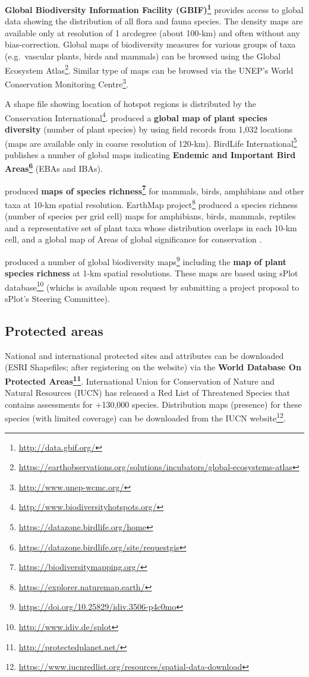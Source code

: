 \documentclass[
  graybox,natbib,nospthms]{svmono}
\renewcommand{\href}[2]{#2 (\url{#1})}
\renewcommand{\href}[2]{#2\footnote{\url{#1}}}
\begin{document}
\textbf{\href{http://data.gbif.org/}{Global Biodiversity Information Facility (GBIF)}} provides access to global data showing the distribution of
all flora and fauna species. The density maps are available only at resolution of
1 arcdegree (about 100-km) and often without any bias-correction. Global maps of biodiversity measures for various groups
of taxa (e.g.~vascular plants, birds and mammals) can be browsed using the \href{https://earthobservations.org/solutions/incubators/global-ecosystems-atlas}{Global Ecosystem Atlas}.
Similar type of maps can be browsed via the \href{http://www.unep-wcmc.org/}{UNEP's World Conservation Monitoring Centre}.

A shape file showing location of hotspot regions is distributed by the \href{http://www.biodiversityhotspots.org/}{Conservation International}.
\citet{Kreft2007} produced a \textbf{global map of plant species diversity} (number of plant species) by using
field records from 1,032 locations (maps are available only in coarse resolution of 120-km).
\href{https://datazone.birdlife.org/home}{BirdLife International} publishes a number of global maps
indicating \textbf{\href{https://datazone.birdlife.org/site/requestgis}{Endemic and Important Bird Areas}} (EBAs and IBAs).

\citet{pimm2014biodiversity} produced \textbf{\href{https://biodiversitymapping.org/}{maps of species richness}} for
mammals, birds, amphibians and other taxa at 10-km spatial resolution.
\href{https://explorer.naturemap.earth/}{EarthMap project} produced a species richness (number of species per grid cell) maps
for amphibians, birds, mammals, reptiles and a representative set of plant taxa whose
distribution overlaps in each 10-km cell, and a global map of Areas of global significance for conservation \citep{brooks2019measuring}.

\citet{sabatini2022global} produced a number of \href{https://doi.org/10.25829/idiv.3506-p4c0mo}{global biodiversity maps}
including the \textbf{map of plant species richness} at 1-km spatial resolutions. These maps are based using \href{http://www.idiv.de/splot}{sPlot database}
(whichs is available upon request by submitting a project proposal to sPlot's Steering Committee).

\hypertarget{protected-areas}{%
\subsection{Protected areas}\label{protected-areas}}

National and international protected sites and attributes can be downloaded
(ESRI Shapefiles; after registering on the website) via the \textbf{\href{http://protectedplanet.net/}{World Database On Protected Areas}}.
International Union for Conservation of Nature and Natural Resources (IUCN) has
released a Red List of Threatened Species that contains assessments for +130,000 species.
Distribution maps (presence) for these species (with limited coverage) can be downloaded from the \href{https://www.iucnredlist.org/resources/spatial-data-download}{IUCN website}.
\end{document}
